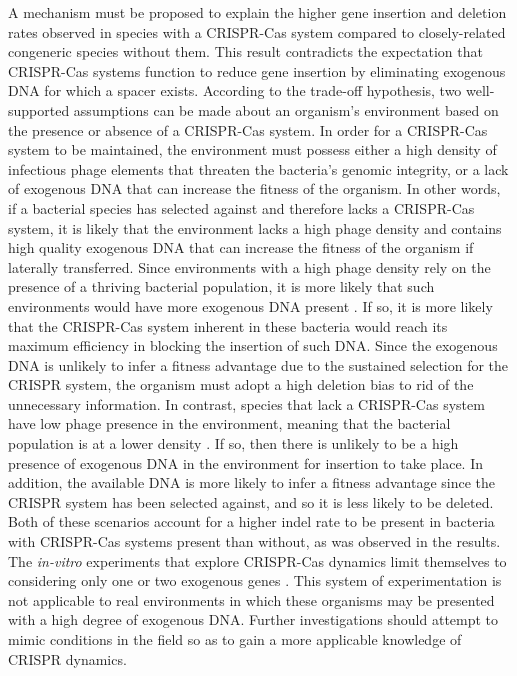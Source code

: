 \documentclass[english]{article}
\begin{document}
A mechanism must be proposed to explain the higher gene
insertion and deletion rates observed in species with a CRISPR-Cas
system compared to closely-related congeneric species without them.
This result contradicts the expectation that CRISPR-Cas systems
function to reduce gene insertion by eliminating exogenous DNA for
which a spacer exists. According to the trade-off hypothesis, two
well-supported assumptions can be made about an organism's environment
based on the presence or absence of a CRISPR-Cas system. In order for
a CRISPR-Cas system to be maintained, the environment must possess
either a high density of infectious phage elements that threaten the
bacteria's genomic integrity, or a lack of exogenous DNA that
can increase the fitness of the organism. In other words, if a
bacterial species has selected against and therefore lacks a
CRISPR-Cas system, it is likely that the environment lacks a high
phage density and contains high quality exogenous DNA that can
increase the fitness of the organism if laterally transferred. Since
environments with a high phage density rely on the presence of a
thriving bacterial population, it is more likely that such
environments would have more exogenous DNA present \citep{Koon:15}. 
If so, it is more
likely that the CRISPR-Cas system inherent in these bacteria would
reach its maximum efficiency in blocking the insertion of such DNA.
Since the exogenous DNA is unlikely to infer a fitness advantage due to the
sustained selection for the CRISPR system, the organism must adopt a
high deletion bias to rid of the unnecessary information. In contrast,
species that lack a CRISPR-Cas system have low phage presence in the
environment, meaning that the bacterial population is at a lower
density \citep{Koon:15}. 
If so, then there is unlikely to be a high presence of
exogenous DNA in the environment for insertion to take place. In
addition, the available DNA is more likely to infer a fitness
advantage since
the CRISPR system has been selected against, and so it is less likely
to be deleted. Both of these scenarios account for a higher indel rate
to be present in bacteria with CRISPR-Cas systems present than
without, as was observed in the results.  The \textit{in-vitro} experiments
that explore CRISPR-Cas dynamics limit themselves to considering only
one or two exogenous genes \citep{Bika:12}. This system of experimentation is not
applicable to real environments in which these organisms may be
presented with a high degree of exogenous DNA. 
Further investigations should attempt to mimic conditions in
the field so as to gain a more applicable knowledge of CRISPR
dynamics. 
\end{document}
